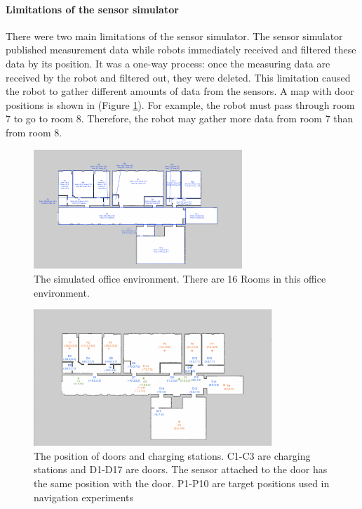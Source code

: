 \paragraph{Limitations of the sensor simulator}
There were two main limitations of the sensor simulator. The sensor simulator published measurement data while robots immediately received and filtered these data by its position. It was a one-way process: once the measuring data are received by the robot and filtered out, they were deleted.  This limitation caused the robot to gather different amounts of data from the sensors. A map with door positions is shown in (Figure \ref{fig:experiment_rooms}). For example, the robot must pass through room 7 to go to room 8. Therefore, the robot may gather more data from room 7 than from room 8.

\begin{figure}
 \centering
 \includegraphics[width = 0.7\textwidth]{content/images/ch1/room_division.png}
 \caption{The simulated office environment. There are 16 Rooms in this office environment.}
 \label{fig:experiment_rooms}
\end{figure}

\begin{figure}
 \centering
 \includegraphics[width = 0.8\textwidth]{content/images/ch5/door_station_points.png}
 \caption{The position of doors and charging stations. C1-C3 are charging stations and D1-D17 are doors. The sensor attached to the door has the same position with the door. P1-P10 are target positions used in navigation experiments}
 \label{fig:door_station}
 \end{figure}

